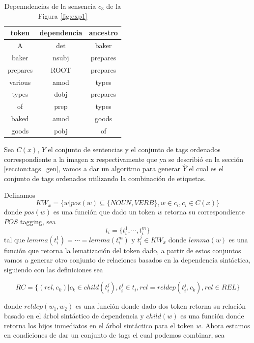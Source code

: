 \begin{table}[ht]
    \centering
    \begin{tabular}{|c|c|c|}
        \hline
        \textbf{token} & \textbf{dependencia} & \textbf{ancestro}\\
        \hline \hline
        A & det & baker \\
        \hline
        baker & nsubj & prepares \\
        \hline
        prepares & ROOT & prepares \\
        \hline
        various &amod & types \\
        \hline
        types & dobj & prepares \\
        \hline
        of & prep & types \\
        \hline
        baked & amod & goods \\
        \hline
        goods & pobj & of \\
        \hline
    \end{tabular}
    \caption{Depenndencias de la sensencia $c_{3}$ de la Figura \ref{fig:exp1}}
    \label{tab:dep_s3_exp1}
\end{table}

Sea $C(x)$, $Y$ el conjunto de sentencias y el conjunto de tags ordenados correspondiente a la imagen x respectivamente que ya se describió en la sección \ref{seccion:tags_gen}, vamos a dar un algoritmo para generar $\hat{Y}$ el cual es el conjunto de tags ordenados utilizando la combinación de etiquetas.

Definamos \[KW_{x} = \{w | pos(w) \subseteq \{NOUN, VERB\}, w  \in c_{i}, c_{i} \in C(x) \}\] donde $pos(w)$ es una función que dado un token $w$ retorna su correspondiente $POS$ tagging, sea \[t_{i}= \{t_{i}^{1}, \cdots ,t_{i}^{m} \}\] tal que $lemma(t_{i}^{1}) = \cdots = lemma(t_{i}^{m})$ y $t_{i}^{j} \in KW_{x}$ donde $lemma(w)$ es una función que retorna la lematización del token dado, a partir de estos conjuntos vamos a generar otro conjunto de relaciones basados en la dependencia sintáctica, siguiendo con las definiciones sea 

\[RC = \{(rel, c_{k}) |  c_{k} \in child(t_{i}^{j}), t_{i}^{j} \in t_{i}, rel = reldep(t_{i}^{j}, c_{k}), rel \in REL \}\]

donde $reldep(w_{1}, w_{2})$ es una función donde dado dos token retorna su relación basado en el árbol sintáctico de dependencia y  $child(w)$ es una función donde retorna los hijos inmediatos en el árbol sintáctico para el token $w$. Ahora estamos en condiciones de dar un conjunto de tags el cual podemos combinar, sea

